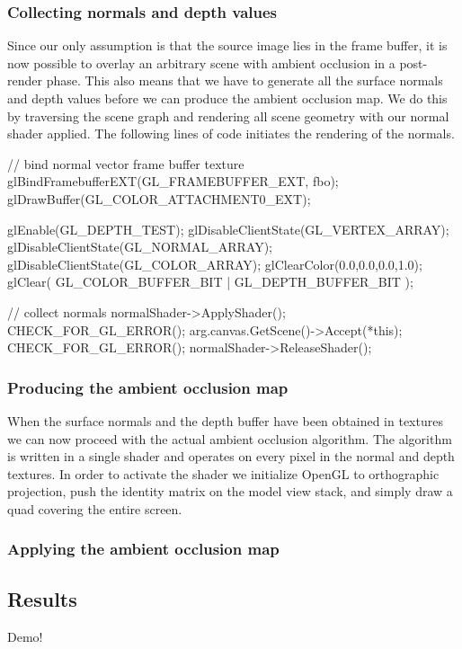 \subsubsection*{Collecting normals and depth values}  
Since our only assumption is that the source image lies in the frame
buffer, it is now possible to overlay an arbitrary scene with ambient
occlusion in a post-render phase. This also means that we have to
generate all the surface normals and depth values before we can
produce the ambient occlusion map. We do this by traversing the scene
graph and rendering all scene geometry with our normal shader
applied. The following lines of code initiates the rendering of the normals.
\begin{cppcode}
  // bind normal vector frame buffer texture
  glBindFramebufferEXT(GL_FRAMEBUFFER_EXT, fbo);
  glDrawBuffer(GL_COLOR_ATTACHMENT0_EXT);
  
  glEnable(GL_DEPTH_TEST);
  glDisableClientState(GL_VERTEX_ARRAY);
  glDisableClientState(GL_NORMAL_ARRAY);
  glDisableClientState(GL_COLOR_ARRAY);
  glClearColor(0.0,0.0,0.0,1.0);
  glClear( GL_COLOR_BUFFER_BIT | GL_DEPTH_BUFFER_BIT );
  
  // collect normals 
  normalShader->ApplyShader();
  CHECK_FOR_GL_ERROR();
  arg.canvas.GetScene()->Accept(*this);
  CHECK_FOR_GL_ERROR();
  normalShader->ReleaseShader();
\end{cppcode} 

\subsubsection*{Producing the ambient occlusion map}  
When the surface normals and the depth buffer have been obtained in
textures we can now proceed with the actual ambient occlusion
algorithm. The algorithm is written in a single shader and operates on
every pixel in the normal and depth textures. In order to activate the
shader we initialize OpenGL to orthographic projection, push the
identity matrix on the model view stack, and simply draw a quad
covering the entire screen.

\subsubsection*{Applying the ambient occlusion map}


\subsection{Results}
Demo!

